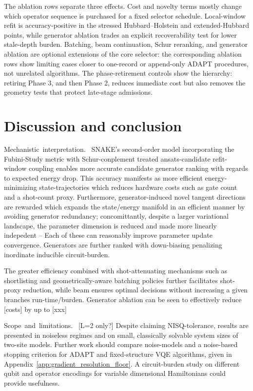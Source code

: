 \documentclass[
  reprint,
  amsmath,
  amssymb,
  aps,
  pra,
  nofootinbib,
  superscriptaddress,
  floatfix
]{revtex4-2}
\newcommand{\placeholder}[1]{\textcolor{red!70!black}{\ifmmode\left[#1\right]\else\textsf{[#1]}\fi}}
\newcommand{\tentative}[1]{\textcolor{red!70!black}{#1}}
\newcommand{\structlabel}[1]{\noindent\mbox{\tentative{#1.}}~}
\begin{document}
The ablation rows separate three effects. Cost and novelty terms mostly change which operator sequence is purchased for a fixed selector schedule. Local-window refit is accuracy-positive in the stressed Hubbard--Holstein and extended-Hubbard points, while generator ablation trades an explicit recoverability test for lower stale-depth burden. Batching, beam continuation, Schur reranking, and generator ablation are optional extensions of the core selector: the corresponding ablation rows show limiting cases closer to one-record or append-only ADAPT procedures, not unrelated algorithms. The phase-retirement controls show the hierarchy: retiring Phase 3, and then Phase 2, reduces immediate cost but also removes the geometry tests that protect late-stage admissions.


\section{Discussion and conclusion}
\label{sec:discussion}
\label{sec:conclusion}

\structlabel{Mechanistic interpretation}
SNAKE's second-order model incorporating the Fubini-Study metric with Schur-conplement treated ansats-candidate refit-window coupling enables more accurate candidate generator ranking with regards to expected energy drop. This accuracy manifests as more efficient energy-minimizing state-trajectories which reduces hardware costs such as gate count and a shot-count proxy. Furthermore, generator-induced novel tangent directions are rewarded which expands the state/energy manifold in an efficient manner by avoiding generator redundancy; concomittantly, despite a larger variational landscape, the parameter dimension is reduced and made more linearly indepedent -- Each of these can reasonably improve parameter update convergence. Generators are further ranked with down-biasing penalizing inordinate inducible circuit-burden.

The greater efficiency combined with shot-attenuating mechanisms such as shortlisting and geometrically-aware batching policies further facilitates shot-proxy reduction, while beam ensures optimal decisions without increasing a given branches run-time/burden. Generator ablation can be seen to effectively reduce \placeholder{costs} by up to \placeholder{xxx}

\structlabel{Scope and limitations}
\placeholder{L=2 only?}
Despite claiming NISQ-tolerance, results are presented in noiseless regimes and on small, classically solvable system sizes of two-site models. Further work should compare noise-models and a noise-based stopping criterion for ADAPT and fixed-structure VQE algorithms, given in Appendix~\ref{app:gradient_resolution_floor}. A circuit-burden study on different qubit and operator encodings for variable dimensional Hamiltonians could provide usefulness.
\end{document}
